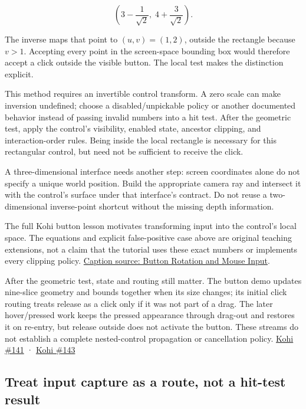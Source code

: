 \[
\left(3-\frac1{\sqrt2},\;4+\frac3{\sqrt2}\right).
\]

The inverse maps that point to \((u,v)=(1,2)\), outside the rectangle because \(v>1\). Accepting every point in the screen-space bounding box would therefore accept a click outside the visible button. The local test makes the distinction explicit.

This method requires an invertible control transform. A zero scale can make inversion undefined; choose a disabled/unpickable policy or another documented behavior instead of passing invalid numbers into a hit test. After the geometric test, apply the control's visibility, enabled state, ancestor clipping, and interaction-order rules. Being inside the local rectangle is necessary for this rectangular control, but need not be sufficient to receive the click.

A three-dimensional interface needs another step: screen coordinates alone do not specify a unique world position. Build the appropriate camera ray and intersect it with the control's surface under that interface's contract. Do not reuse a two-dimensional inverse-point shortcut without the missing depth information.

The full Kohi button lesson motivates transforming input into the control's local space. The equations and explicit false-positive case above are original teaching extensions, not a claim that the tutorial uses these exact numbers or implements every clipping policy. \href{https://www.youtube.com/watch?v=VuPFUCVGy9U}{Caption source: Button Rotation and Mouse Input}.

After the geometric test, state and routing still matter. The button demo updates nine-slice geometry and bounds together when its size changes; its initial click routing treats release as a click only if it was not part of a drag. The later hover/pressed work keeps the pressed appearance through drag-out and restores it on re-entry, but release outside does not activate the button. These streams do not establish a complete nested-control propagation or cancellation policy. \href{https://www.youtube.com/watch?v=VuPFUCVGy9U}{Kohi \#141} · \href{https://www.youtube.com/watch?v=jLSfss8YrXE}{Kohi \#143}

\subsection{Treat input capture as a route, not a hit-test result}\label{05-engine-i-ch013-treat-input-capture-as-a-route-not-a-hit-test-result}

